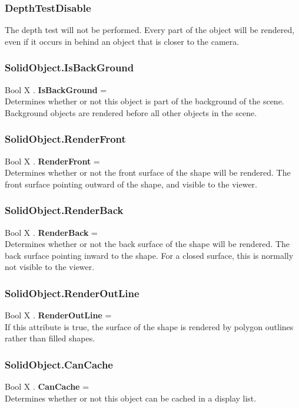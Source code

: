 \documentclass[10pt]{book}
\begin{document}
\subsubsection{DepthTestDisable \label{T:DepthTest|DepthTestDisable}}
The depth test will not be performed. Every part of the object will be rendered, even if it occurs in behind an object that is closer to the camera.

\subsubsection{SolidObject.IsBackGround \label{F:SolidObject:IsBackGround}}
Bool X . \textbf{IsBackGround} = \\
Determines whether or not this object is part of the background of the scene. Background objects are rendered before all other objects in the scene.

\subsubsection{SolidObject.RenderFront \label{F:SolidObject:RenderFront}}
Bool X . \textbf{RenderFront} = \\
Determines whether or not the front surface of the shape will be rendered. The front surface pointing outward of the shape, and visible to the viewer.

\subsubsection{SolidObject.RenderBack \label{F:SolidObject:RenderBack}}
Bool X . \textbf{RenderBack} = \\
Determines whether or not the back surface of the shape will be rendered. The back surface pointing inward to the shape. For a closed surface, this is normally not visible to the viewer.

\subsubsection{SolidObject.RenderOutLine \label{F:SolidObject:RenderOutLine}}
Bool X . \textbf{RenderOutLine} = \\
If this attribute is true, the surface of the shape is rendered by polygon outlines rather than filled shapes.

\subsubsection{SolidObject.CanCache \label{F:SolidObject:CanCache}}
Bool X . \textbf{CanCache} = \\
Determines whether or not this object can be cached in a display list.
\end{document}

